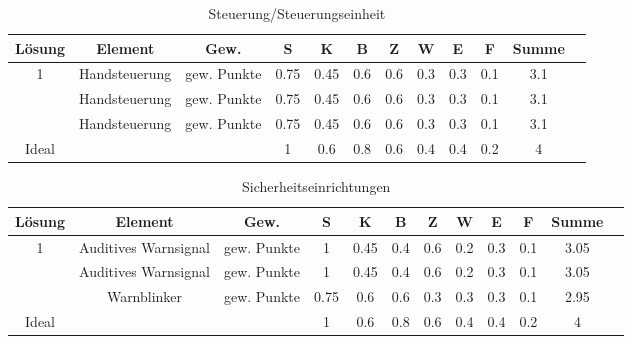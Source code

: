 \documentclass[10pt,a4paper]{article}
\begin{document}
\begin{table}[h!]
    \centering
    \begin{tabular}{cccccccccccc}
        \toprule
        \textbf{Lösung} & \textbf{Element} & \textbf{Gew.} & \textbf{S} & \textbf{K} & \textbf{B} & \textbf{Z} & \textbf{W} & \textbf{E} & \textbf{F} & \textbf{Summe} & \\
        \midrule
        1               & Handsteuerung    & gew. Punkte   & 0.75       & 0.45       & 0.6        & 0.6        & 0.3        & 0.3        & 0.1        & 3.1              \\
        \addlinespace
        2               & Handsteuerung    & gew. Punkte   & 0.75       & 0.45       & 0.6        & 0.6        & 0.3        & 0.3        & 0.1        & 3.1              \\
        \addlinespace
        3               & Handsteuerung    & gew. Punkte   & 0.75       & 0.45       & 0.6        & 0.6        & 0.3        & 0.3        & 0.1        & 3.1              \\
        \midrule
        Ideal           &                  &               & 1          & 0.6        & 0.8        & 0.6        & 0.4        & 0.4        & 0.2        & 4                \\
        \bottomrule
    \end{tabular}
    \caption{Steuerung/Steuerungseinheit}
    \label{tab:steuerung}
\end{table}


\begin{table}[h!]
    \centering
    \begin{tabular}{cccccccccccc}
        \toprule
        \textbf{Lösung} & \textbf{Element}     & \textbf{Gew.} & \textbf{S} & \textbf{K} & \textbf{B} & \textbf{Z} & \textbf{W} & \textbf{E} & \textbf{F} & \textbf{Summe} & \\
        \midrule
        1               & Auditives Warnsignal & gew. Punkte   & 1          & 0.45       & 0.4        & 0.6        & 0.2        & 0.3        & 0.1        & 3.05             \\
        \addlinespace
        2               & Auditives Warnsignal & gew. Punkte   & 1          & 0.45       & 0.4        & 0.6        & 0.2        & 0.3        & 0.1        & 3.05             \\
        \addlinespace
        3               & Warnblinker          & gew. Punkte   & 0.75       & 0.6        & 0.6        & 0.3        & 0.3        & 0.3        & 0.1        & 2.95             \\
        \midrule
        Ideal           &                      &               & 1          & 0.6        & 0.8        & 0.6        & 0.4        & 0.4        & 0.2        & 4                \\
        \bottomrule
    \end{tabular}
    \caption{Sicherheitseinrichtungen}
    \label{tab:sicherheitseinrichtungen}
\end{table}
\end{document}
